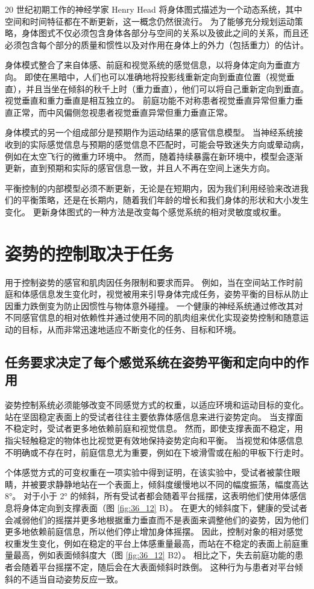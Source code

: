 20 世纪初期工作的神经学家 Henry Head 将身体图式描述为一个动态系统，其中空间和时间特征都在不断更新，这一概念仍然很流行。 为了能够充分规划运动策略，身体图式不仅必须包含身体各部分与空间的关系以及彼此之间的关系，而且还必须包含每个部分的质量和惯性以及对作用在身体上的外力（包括重力）的估计。

身体模式整合了来自体感、前庭和视觉系统的感觉信息，以将身体定向为垂直方向。 即使在黑暗中，人们也可以准确地将投影线重新定向到垂直位置（视觉垂直），并且当坐在倾斜的秋千上时（重力垂直），他们可以将自己重新定向到垂直。 视觉垂直和重力垂直是相互独立的。 前庭功能不对称患者视觉垂直异常但重力垂直正常，而中风偏侧忽视患者视觉垂直异常但重力垂直正常。

身体模式的另一个组成部分是预期作为运动结果的感官信息模型。 当神经系统接收到的实际感觉信息与预期的感觉信息不匹配时，可能会导致迷失方向或晕动病，例如在太空飞行的微重力环境中。 然而，随着持续暴露在新环境中，模型会逐渐更新，直到预期和实际的感官信息一致，并且人不再在空间上迷失方向。

平衡控制的内部模型必须不断更新，无论是在短期内，因为我们利用经验来改进我们的平衡策略，还是在长期内，随着我们年龄的增长和我们身体的形状和大小发生变化。 更新身体图式的一种方法是改变每个感觉系统的相对灵敏度或权重。


\section{姿势的控制取决于任务}
用于控制姿势的感官和肌肉因任务限制和要求而异。 例如，当在空间站工作时前庭和体感信息发生变化时，视觉被用来引导身体完成任务，姿势平衡的目标从防止因重力跌倒变为防止因惯性与物体意外碰撞。 一个健康的神经系统通过修改其对不同感官信息的相对依赖性并通过使用不同的肌肉组来优化实现姿势控制和随意运动的目标，从而非常迅速地适应不断变化的任务、目标和环境。

\subsection{任务要求决定了每个感觉系统在姿势平衡和定向中的作用}
姿势控制系统必须能够改变不同感觉方式的权重，以适应环境和运动目标的变化。 站在坚固稳定表面上的受试者往往主要依靠体感信息来进行姿势定向。 当支撑面不稳定时，受试者更多地依赖前庭和视觉信息。 然而，即使支撑表面不稳定，用指尖轻触稳定的物体也比视觉更有效地保持姿势定向和平衡。 当视觉和体感信息不明确或不存在时，前庭信息尤为重要，例如在下坡滑雪或在船的甲板下行走时。

个体感觉方式的可变权重在一项实验中得到证明，在该实验中，受试者被蒙住眼睛，并被要求静静地站在一个表面上，倾斜度缓慢地以不同的幅度振荡，幅度高达 8°。 对于小于 2° 的倾斜，所有受试者都会随着平台摇摆，这表明他们使用体感信息将身体定向到支撑表面（图 \ref{fig:36_12} B）。 在更大的倾斜度下，健康的受试者会减弱他们的摇摆并更多地根据重力垂直而不是表面来调整他们的姿势，因为他们更多地依赖前庭信息，所以他们停止增加身体摇摆。 因此，控制对象的相对感觉权重发生变化，例如在稳定的平台上体感重量最高，而站在不稳定的表面上前庭重量最高，例如表面倾斜度大（图 \ref{fig:36_12} B2）。 相比之下，失去前庭功能的患者会随着平台摇摆不定，随后会在大表面倾斜时跌倒。 这种行为与患者对平台倾斜的不适当自动姿势反应一致。

